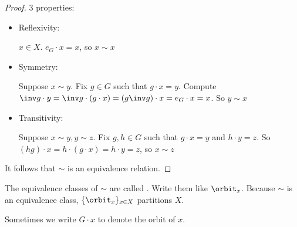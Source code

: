 \documentclass[notes.tex]{subfiles}
\begin{document}
\begin{proof} 3 properties:
	\begin{itemize}
		\item Reflexivity:

		$x\in X$. $e_G\cdot x = x$, so $x\sim x$
		\item Symmetry: 

		Suppose $x\sim y$.
		Fix $g\in G$ such that $g\cdot x = y$. Compute $\inv g \cdot y = \inv g \cdot(g\cdot x) = (g\inv g)\cdot x = e_G\cdot x = x$. So $y\sim x$
		\item Transitivity:

		Suppose $x\sim y, y\sim z$.
		Fix $g, h\in G$ such that $g\cdot x = y$ and $h\cdot y = z$.
		So $(hg)\cdot x = h\cdot(g\cdot x) = h\cdot y = z$, so $x\sim z$
	\end{itemize}

	It follows that $\sim$ is an equivalence relation.
\end{proof}

\begin{defn}
	The equivalence classes of $\sim$ are called .
	Write them like $\orbit_x$. Because $\sim$ is an equivalence class, $\{\orbit_x\}_{x\in X}$ partitions $X$.
\end{defn}


\begin{notation}
	Sometimes we write $G\cdot x$ to denote the orbit of $x$.
\end{notation}
\end{document}
